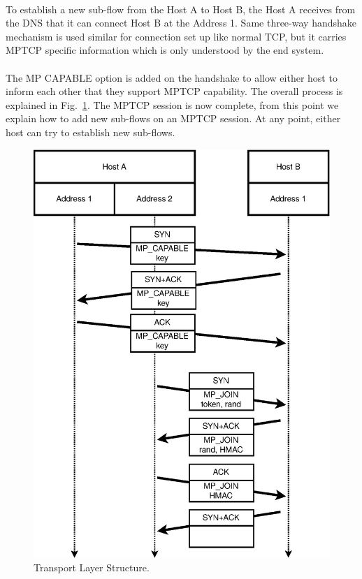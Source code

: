 \paragraph{}To establish a new sub-flow from the Host A to Host B, the Host A receives from the DNS that it can connect Host B at the Address 1. Same three-way handshake mechanism is used similar for connection set up like normal TCP, but it carries MPTCP specific information which is only understood by the end system.

\paragraph{}The MP CAPABLE option is added on the handshake to allow either host to inform each other that they support MPTCP capability. The overall process is explained in Fig.~\ref{fig:ConnectionHandling}. The MPTCP session is now complete, from this point we explain how to add new sub-flows on an MPTCP session. At any point, either host can try to establish new sub-flows.

\begin{figure}[h]
    \centering
    \includegraphics[width=.7\textwidth]{img/mptcp/mptcp_con}
    \caption{Transport Layer Structure.}
    \label{fig:ConnectionHandling}
\end{figure}


